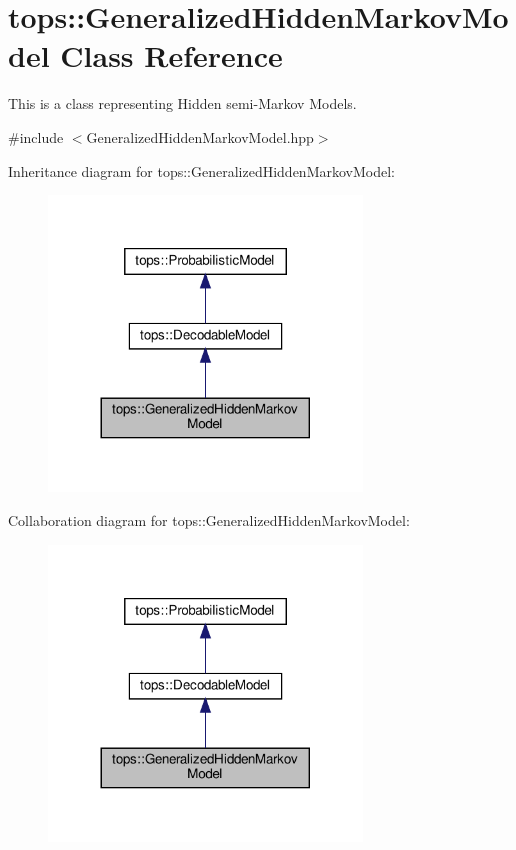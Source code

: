 \hypertarget{classtops_1_1GeneralizedHiddenMarkovModel}{}\section{tops\+:\+:Generalized\+Hidden\+Markov\+Model Class Reference}
\label{classtops_1_1GeneralizedHiddenMarkovModel}


This is a class representing Hidden semi-\/\+Markov Models.  




{\ttfamily \#include $<$Generalized\+Hidden\+Markov\+Model.\+hpp$>$}



Inheritance diagram for tops\+:\+:Generalized\+Hidden\+Markov\+Model\+:
\nopagebreak
\begin{figure}[H]
\begin{center}
\leavevmode
\includegraphics[width=236pt]{classtops_1_1GeneralizedHiddenMarkovModel__inherit__graph}
\end{center}
\end{figure}


Collaboration diagram for tops\+:\+:Generalized\+Hidden\+Markov\+Model\+:
\nopagebreak
\begin{figure}[H]
\begin{center}
\leavevmode
\includegraphics[width=236pt]{classtops_1_1GeneralizedHiddenMarkovModel__coll__graph}
\end{center}
\end{figure}

